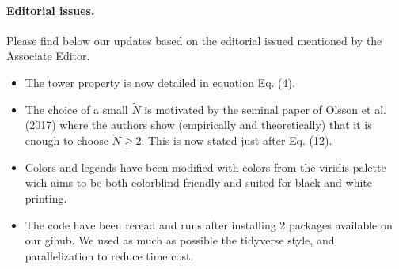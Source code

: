\documentclass{article}
\begin{document}
\paragraph{Editorial issues. } Please find below our updates based on the editorial issued mentioned by the Associate Editor.
    \begin{itemize}
        \item The tower property is now detailed in equation Eq. (4).
        \item The choice of a small $\tilde N$ is motivated by the seminal paper of Olsson et al. (2017) where the authors show (empirically and theoretically) that it is enough to choose $\tilde N \geq 2$. This is now stated just after Eq. (12).
        \item Colors and legends have been modified with colors from the viridis palette wich aims to be both colorblind friendly and suited for black and white printing.
        \item The code have been reread and runs after installing 2 packages available on our gihub. We used as much as possible the tidyverse style, and parallelization to reduce time cost.
    \end{itemize}
\end{document}
